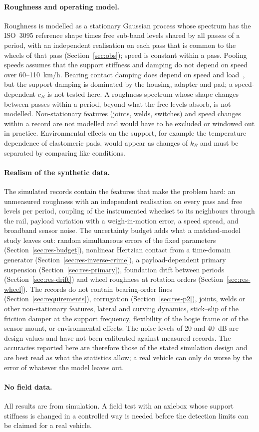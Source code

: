 \paragraph{Roughness and operating model.} Roughness is modelled as a stationary Gaussian process
whose spectrum has the ISO~3095 reference shape times free sub-band levels shared by all passes of a
period, with an independent realisation on each pass that is common to the wheels of that pass
(Section~\ref{sec:obs}); speed is constant within a pass. Pooling speeds assumes that the support
stiffness and damping do not depend on speed over 60--110~km/h. Bearing contact damping does depend on
speed and load~\citep{zheng2025}, but the support damping is dominated by the housing, adapter and pad;
a speed-dependent $c_B$ is not tested here. A roughness spectrum whose shape changes
between passes within a period, beyond what the free levels absorb, is not modelled. Non-stationary features (joints, welds, switches) and speed changes
within a record are not modelled and would have to be excluded or windowed out in practice.
Environmental effects on the support, for example the temperature dependence of elastomeric pads,
would appear as changes of $k_B$ and must be separated by comparing like conditions.

\paragraph{Realism of the synthetic data.} The simulated records contain the features that make the
problem hard: an unmeasured roughness with an independent realisation on every pass and free levels per
period, coupling of the instrumented wheelset to its neighbours through the rail, payload variation with
a weigh-in-motion error, a speed spread, and broadband sensor noise. The uncertainty budget adds what a
matched-model study leaves out: random simultaneous errors of the fixed parameters
(Section~\ref{sec:res-budget}), nonlinear Hertzian contact from a time-domain generator
(Section~\ref{sec:res-inverse-crime}), a payload-dependent primary suspension
(Section~\ref{sec:res-primary}), foundation drift between periods (Section~\ref{sec:res-drift}) and wheel
roughness at rotation orders (Section~\ref{sec:res-wheel}). The records do not contain bearing-order
lines (Section~\ref{sec:requirements}), corrugation (Section~\ref{sec:res-p2}), joints, welds or other
non-stationary features, lateral and curving dynamics, stick--slip of the friction damper at the support
frequency, flexibility of the bogie frame or of the sensor mount, or environmental effects. The noise
levels of 20 and 40~dB are design values and have not been calibrated against measured records. The
accuracies reported here are therefore those of the stated simulation design and are best read as what
the statistics allow; a real vehicle can only do worse by the error of whatever the model leaves out.

\paragraph{No field data.} All results are from simulation. A field test with an axlebox whose
support stiffness is changed in a controlled way is needed before the detection limits can be
claimed for a real vehicle.
